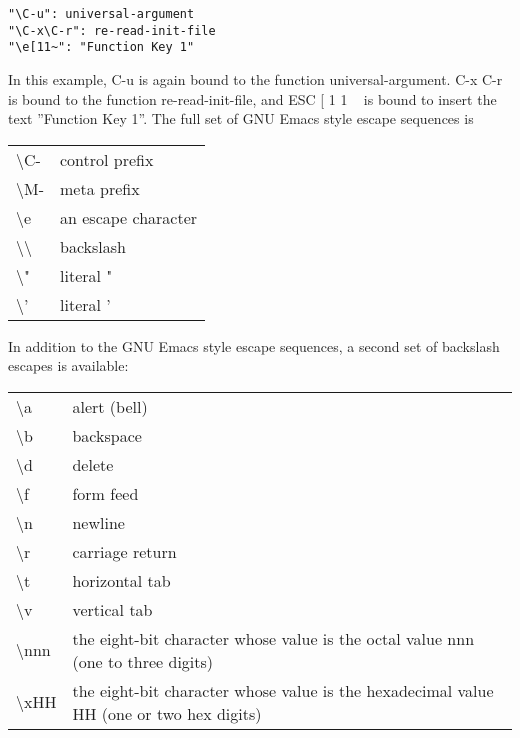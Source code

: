 \begin{lstlisting}
"\C-u": universal-argument
"\C-x\C-r": re-read-init-file
"\e[11~": "Function Key 1"
\end{lstlisting}
In this example, C-u is again bound to the function universal-argument. C-x C-r is bound to the function re-read-init-file, and ESC [ 1 1 ~ is bound to insert the text ''Function Key 1''.
The full set of GNU Emacs style escape sequences is
\begin{longtable}{p{}p{}}
\textbackslash C- &
control prefix \\

\textbackslash M- &
meta prefix \\

\textbackslash e &
an escape character \\

\textbackslash \textbackslash &
backslash \\

\textbackslash " &
literal " \\

\textbackslash ' &
literal ' \\
\end{longtable}
In addition to the GNU Emacs style escape sequences, a second set of backslash escapes is available:

\begin{longtable}{p{}p{}}
\textbackslash a &
alert (bell) \\

\textbackslash b &
backspace \\

\textbackslash d &
delete \\

\textbackslash f &
form feed \\

\textbackslash n &
newline \\

\textbackslash r &
carriage return \\

\textbackslash t &
horizontal tab \\

\textbackslash v &
vertical tab \\

\textbackslash nnn &
the eight-bit character whose value is the octal value nnn (one to three digits) \\

\textbackslash xHH &
the eight-bit character whose value is the hexadecimal value HH (one or two hex digits) \\
\end{longtable}


